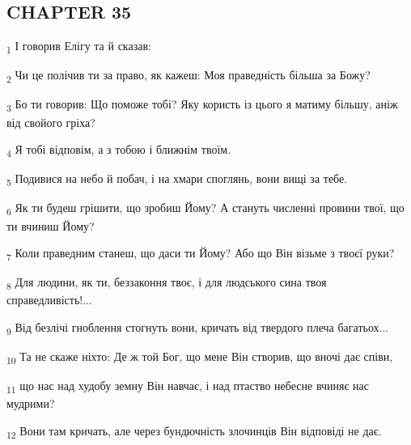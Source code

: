\subsection{CHAPTER 35}
\begin{tcolorbox}
\textsubscript{1} І говорив Елігу та й сказав:
\end{tcolorbox}
\begin{tcolorbox}
\textsubscript{2} Чи це полічив ти за право, як кажеш: Моя праведність більша за Божу?
\end{tcolorbox}
\begin{tcolorbox}
\textsubscript{3} Бо ти говорив: Що поможе тобі? Яку користь із цього я матиму більшу, аніж від свойого гріха?
\end{tcolorbox}
\begin{tcolorbox}
\textsubscript{4} Я тобі відповім, а з тобою і ближнім твоїм.
\end{tcolorbox}
\begin{tcolorbox}
\textsubscript{5} Подивися на небо й побач, і на хмари споглянь, вони вищі за тебе.
\end{tcolorbox}
\begin{tcolorbox}
\textsubscript{6} Як ти будеш грішити, що зробиш Йому? А стануть численні провини твої, що ти вчиниш Йому?
\end{tcolorbox}
\begin{tcolorbox}
\textsubscript{7} Коли праведним станеш, що даси ти Йому? Або що Він візьме з твоєї руки?
\end{tcolorbox}
\begin{tcolorbox}
\textsubscript{8} Для людини, як ти, беззаконня твоє, і для людського сина твоя справедливість!...
\end{tcolorbox}
\begin{tcolorbox}
\textsubscript{9} Від безлічі гноблення стогнуть вони, кричать від твердого плеча багатьох...
\end{tcolorbox}
\begin{tcolorbox}
\textsubscript{10} Та не скаже ніхто: Де ж той Бог, що мене Він створив, що вночі дає співи,
\end{tcolorbox}
\begin{tcolorbox}
\textsubscript{11} що нас над худобу земну Він навчає, і над птаство небесне вчиняє нас мудрими?
\end{tcolorbox}
\begin{tcolorbox}
\textsubscript{12} Вони там кричать, але через бундючність злочинців Він відповіді не дає.
\end{tcolorbox}
